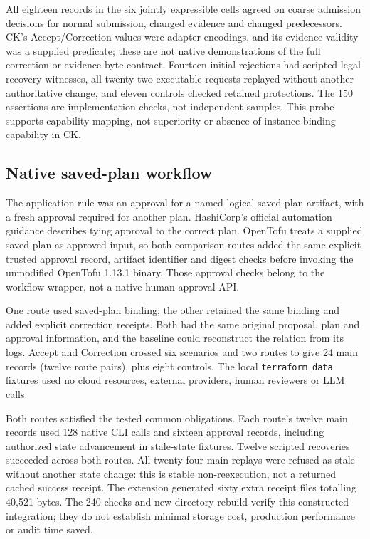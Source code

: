 \documentclass[10pt,a4paper]{article}
\begin{document}
All eighteen records in the six jointly expressible cells agreed on coarse admission decisions for normal submission, changed evidence and changed predecessors. CK's Accept/Correction values were adapter encodings, and its evidence validity was a supplied predicate; these are not native demonstrations of the full correction or evidence-byte contract. Fourteen initial rejections had scripted legal recovery witnesses, all twenty-two executable requests replayed without another authoritative change, and eleven controls checked retained protections. The 150 assertions are implementation checks, not independent samples. This probe supports capability mapping, not superiority or absence of instance-binding capability in CK.

\subsection*{Native saved-plan workflow}
The application rule was an approval for a named logical saved-plan artifact, with a fresh approval required for another plan. HashiCorp's official automation guidance describes tying approval to the correct plan. OpenTofu treats a supplied saved plan as approved input, so both comparison routes added the same explicit trusted approval record, artifact identifier and digest checks before invoking the unmodified OpenTofu 1.13.1 binary. Those approval checks belong to the workflow wrapper, not a native human-approval API.

One route used saved-plan binding; the other retained the same binding and added explicit correction receipts. Both had the same original proposal, plan and approval information, and the baseline could reconstruct the relation from its logs. Accept and Correction crossed six scenarios and two routes to give 24 main records (twelve route pairs), plus eight controls. The local \texttt{terraform\_data} fixtures used no cloud resources, external providers, human reviewers or LLM calls.

Both routes satisfied the tested common obligations. Each route's twelve main records used 128 native CLI calls and sixteen approval records, including authorized state advancement in stale-state fixtures. Twelve scripted recoveries succeeded across both routes. All twenty-four main replays were refused as stale without another state change: this is stable non-reexecution, not a returned cached success receipt. The extension generated sixty extra receipt files totalling 40,521 bytes. The 240 checks and new-directory rebuild verify this constructed integration; they do not establish minimal storage cost, production performance or audit time saved.
\end{document}
